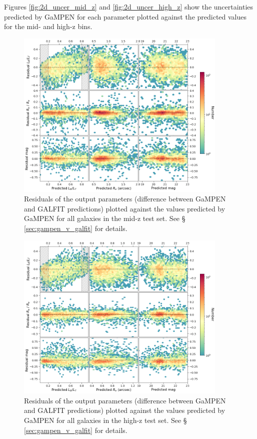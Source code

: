 \documentclass[linenumbers,twocolumn,twocolappendix]{aastex631}
\newcommand\gampen{GaMPEN}
\begin{document}
\begin{CJK*}{UTF8}{gbsn}
Figures \ref{fig:2d_uncer_mid_z} and \ref{fig:2d_uncer_high_z} show the uncertainties predicted by \gampen{} for each parameter plotted against the predicted values for the mid- and high-z bins.

\begin{figure}[htb]
    \centering
    \includegraphics[width = 0.9\textwidth]{2d_res_mid_z.png}
    \caption{Residuals of the output parameters (difference between \gampen{} and GALFIT predictions) plotted against the values predicted by \gampen{} for all galaxies in the mid-z test set. See \S\,\ref{sec:gampen_v_galfit} for details.}
    \label{fig:2d_res_mid_z}
\end{figure}

\begin{figure}[htb]
    \centering
    \includegraphics[width = 0.9\textwidth]{2d_res_high_z.png}
    \caption{Residuals of the output parameters (difference between \gampen{} and GALFIT predictions) plotted against the values predicted by \gampen{} for all galaxies in the high-z test set. See \S\,\ref{sec:gampen_v_galfit} for details.}
    \label{fig:2d_res_high_z}
\end{figure}


\end{CJK*}
\end{document}
